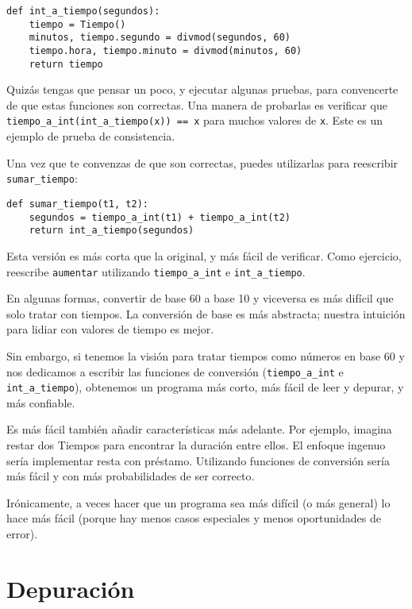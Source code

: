 \documentclass[10pt]{book}
\begin{document}
\begin{verbatim}
def int_a_tiempo(segundos):
    tiempo = Tiempo()
    minutos, tiempo.segundo = divmod(segundos, 60)
    tiempo.hora, tiempo.minuto = divmod(minutos, 60)
    return tiempo
\end{verbatim}
%
Quizás tengas que pensar un poco, y ejecutar algunas pruebas, para convencerte
de que estas funciones son correctas.  Una manera de probarlas es
verificar que \verb"tiempo_a_int(int_a_tiempo(x)) == x" para muchos valores de
{\tt x}.  Este es un ejemplo de prueba de consistencia.

Una vez que te convenzas de que son correctas, puedes utilizarlas para
reescribir \verb"sumar_tiempo":

\begin{verbatim}
def sumar_tiempo(t1, t2):
    segundos = tiempo_a_int(t1) + tiempo_a_int(t2)
    return int_a_tiempo(segundos)
\end{verbatim}
%
Esta versión es más corta que la original, y más fácil de verificar.  Como
ejercicio, reescribe {\tt aumentar} utilizando \verb"tiempo_a_int" e
\verb"int_a_tiempo".

En algunas formas, convertir de base 60 a base 10 y viceversa es más difícil
que solo tratar con tiempos.  La conversión de base es más abstracta; nuestra
intuición para lidiar con valores de tiempo es mejor.

Sin embargo, si tenemos la visión para tratar tiempos como números en base 60 y nos
dedicamos a escribir las funciones de conversión (\verb"tiempo_a_int"
e \verb"int_a_tiempo"), obtenemos un programa más corto, más fácil de
leer y depurar, y más confiable.

Es más fácil también añadir características más adelante.  Por ejemplo, imagina
restar dos Tiempos para encontrar la duración entre ellos.  El
enfoque ingenuo sería implementar resta con préstamo.
Utilizando funciones de conversión sería más fácil y con más probabilidades de ser
correcto.

Irónicamente, a veces hacer que un programa sea más difícil (o más general) lo hace
más fácil (porque hay menos casos especiales y menos oportunidades
de error).


\section{Depuración}
\end{document}
